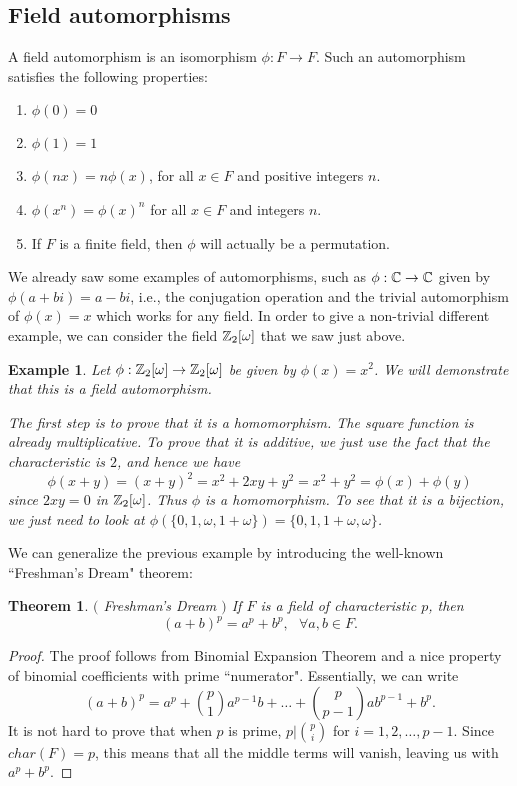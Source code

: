 \documentclass[12pt]{article}
\theoremstyle{plain}
\newtheorem{example}{Example}
\newtheorem{theorem}{Theorem}
\theoremstyle{definition}
\theoremstyle{remark}
\begin{document}
\subsection{Field automorphisms}
A field automorphism is an isomorphism $\phi:F\rightarrow F$. 
Such an automorphism satisfies the following properties:
\begin{enumerate}
    \item $\phi(0)=0$
    \item $\phi(1)=1$
    \item $\phi(nx)=n\phi(x)$, for all $x\in F$ and positive integers $n$.
    \item $\phi(x^n)=\phi(x)^n$ for all $x\in F$ and integers $n$. 
    \item If $F$ is a finite field, then $\phi$ will actually be a permutation. 
\end{enumerate}
We already saw some examples of automorphisms, such as $\phi:\mathbb{C}\rightarrow \mathbb{C}$ given by $\phi(a+bi)=a-bi$, i.e., the conjugation operation and the trivial automorphism of $\phi(x)=x$ which works for any field. In order to give a non-trivial different example, we can consider the field $\mathbb{Z}_2[\omega] $  that we saw just above. 
\begin{example}
Let $\phi:\mathbb{Z}_2[\omega]\rightarrow \mathbb{Z}_2[\omega]$ be given by $\phi(x)=x^2$. We will demonstrate that this is a field automorphism. 

The first step is to prove that it is a homomorphism. The square function is already multiplicative. To prove that it is additive, we just use the fact that the characteristic is $2$, and hence we have
$$\phi(x+y) = (x+y)^2=x^2+2xy+y^2=x^2+y^2 = \phi(x)+\phi(y)$$
since $2xy=0$ in $\mathbb{Z}_2[\omega]$. Thus $\phi$ is a homomorphism. To see that it is a bijection, we just need to look at $\phi(\{0,1,\omega, 1+\omega\}) = \{0,1, 1+\omega, \omega\}$. 
\end{example}
We can generalize the previous example by introducing the well-known ``Freshman's Dream" theorem:
\begin{theorem}$($ Freshman's Dream $)$
If $F$ is a field of characteristic $p$, then 
$$(a+b)^p = a^p+b^p,  \:\:\:\forall a,b \in F.$$
\end{theorem}
\begin{proof}
The proof follows from Binomial Expansion Theorem and a nice property of binomial coefficients with prime ``numerator".
Essentially, we can write
$$(a+b)^p = a^p+\binom{p}{1}a^{p-1}b+\dots +\binom{p}{p-1}ab^{p-1}+b^p.$$
It is not hard to prove that when $p$ is prime, $p|\binom{p}{i}$ for $i=1, 2, \dots, p-1$. Since $char(F)=p$, this means that all the middle terms will vanish, leaving us with $a^p+b^p$.
\end{proof}
\end{document}
